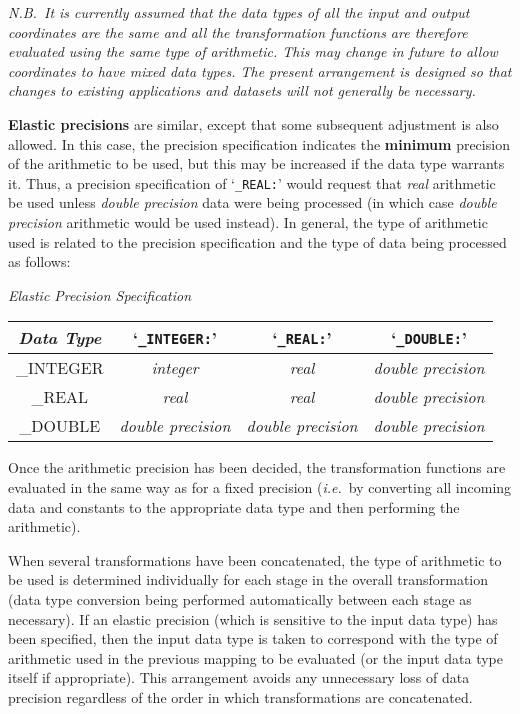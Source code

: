 \documentclass[twoside,nolof,11pt]{starlink}
\providecommand{\name}[1]{\small{#1}}
\begin{document}
\emph{N.B.\ It is currently assumed that the data types of all the input and
output coordinates are the same and all the transformation functions are
therefore evaluated using the same type of arithmetic.
This may change in future to allow coordinates to have mixed data types.
The present arrangement is designed so that changes to existing applications
and datasets will not generally be necessary.}

\textbf{Elastic precisions} are similar, except that some subsequent
adjustment is also allowed.
In this case, the precision specification indicates the \textbf{minimum}
precision of the arithmetic to be used, but this may be increased if the
data type warrants it.
Thus, a precision specification of \mbox{`\texttt{\_REAL:}'} would request that
\emph{real} arithmetic be used unless \emph{double precision} data were being
processed (in which case \emph{double precision} arithmetic would be used
instead).
In general, the type of arithmetic used is related to the precision
specification and the type of data being processed as follows:


\begin{center}
\emph{Elastic Precision Specification}\\
\begin{tabular}{|c|c|c|c|}
\hline
\emph{Data Type} & `\verb#_INTEGER:#' & `\verb#_REAL:#' & `\verb#_DOUBLE:#' \\
\hline
\name{\_INTEGER} & \emph{integer} & \emph{real} & \emph{double precision} \\
\name{\_REAL} & \emph{real} & \emph{real} & \emph{double precision} \\
\name{\_DOUBLE} & \emph{double precision} & \emph{double precision} & \emph{double precision}\\
\hline
\end{tabular}
\end{center}


Once the arithmetic precision has been decided, the transformation functions
are evaluated in the same way as for a fixed precision (\emph{i.e.}\ by
converting all incoming data and constants to the appropriate data type and
then performing the arithmetic).

When several transformations have been concatenated, the type of arithmetic
to be used is determined individually for each stage in the overall
transformation (data type conversion being performed automatically between
each stage as necessary).
If an elastic precision (which is sensitive to the input data type) has been
specified, then the input data type is taken to correspond with the type of
arithmetic used in the previous mapping to be evaluated (or the input data
type itself if appropriate).
This arrangement avoids any unnecessary loss of data precision regardless of
the order in which transformations are concatenated.
\end{document}
